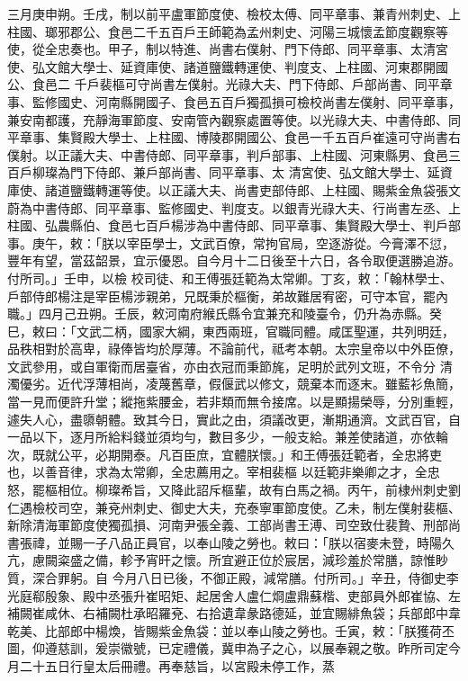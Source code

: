 \begin{pinyinscope}
 三月庚申朔。壬戌，制以前平盧軍節度使、檢校太傅、同平章事、兼青州刺史、上柱國、瑯邪郡公、食邑二千五百戶王師範為孟州刺史、河陽三城懷孟節度觀察等使，從全忠奏也。甲子，制以特進、尚書右僕射、門下侍郎、同平章事、太清宮使、弘文館大學士、延資庫使、諸道鹽鐵轉運使、判度支、上柱國、河東郡開國公、食邑二
 千戶裴樞可守尚書左僕射。光祿大夫、門下侍郎、戶部尚書、同平章事、監修國史、河南縣開國子、食邑五百戶獨孤損可檢校尚書左僕射、同平章事，兼安南都護，充靜海軍節度、安南管內觀察處置等使。以光祿大夫、中書侍郎、同平章事、集賢殿大學士、上柱國、博陵郡開國公、食邑一千五百戶崔遠可守尚書右僕射。以正議大夫、中書侍郎、同平章事，判戶部事、上柱國、河東縣男、食邑三百戶柳璨為門下侍郎、兼戶部尚書、同平章事、太
 清宮使、弘文館大學士、延資庫使、諸道鹽鐵轉運等使。以正議大夫、尚書吏部侍郎、上柱國、賜紫金魚袋張文蔚為中書侍郎、同平章事、監修國史、判度支。以銀青光祿大夫、行尚書左丞、上柱國、弘農縣伯、食邑七百戶楊涉為中書侍郎、同平章事、集賢殿大學士、判戶部事。庚午，敕：「朕以宰臣學士，文武百僚，常拘官局，空逐游從。今膏澤不愆，豐年有望，當茲韶景，宜示優恩。自今月十二日後至十六日，各令取便選勝追游。付所司。」壬申，以檢
 校司徒、和王傅張廷範為太常卿。丁亥，敕：「翰林學士、戶部侍郎楊注是宰臣楊涉親弟，兄既秉於樞衡，弟故難居宥密，可守本官，罷內職。」四月己丑朔。壬辰，敕河南府緱氏縣令宜兼充和陵臺令，仍升為赤縣。癸巳，敕曰：「文武二柄，國家大綱，東西兩班，官職同體。咸匡聖運，共列明廷，品秩相對於高卑，祿俸皆均於厚薄。不論前代，祗考本朝。太宗皇帝以中外臣僚，文武參用，或自軍衛而居臺省，亦由衣冠而秉節旄，足明於武列文班，不令分
 清濁優劣。近代浮薄相尚，凌蔑舊章，假偃武以修文，競棄本而逐末。雖藍衫魚簡，當一見而便許升堂；縱拖紫腰金，若非類而無令接席。以是顯揚榮辱，分別重輕，遽失人心，盡隳朝體。致其今日，實此之由，須議改更，漸期通濟。文武百官，自一品以下，逐月所給料錢並須均勻，數目多少，一般支給。兼差使諸道，亦依輪次，既就公平，必期開泰。凡百臣庶，宜體朕懷。」和王傅張廷範者，全忠將吏也，以善音律，求為太常卿，全忠薦用之。宰相裴樞
 以廷範非樂卿之才，全忠怒，罷樞相位。柳璨希旨，又降此詔斥樞輩，故有白馬之禍。丙午，前棣州刺史劉仁遇檢校司空，兼兗州刺史、御史大夫，充泰寧軍節度使。乙未，制左僕射裴樞、新除清海軍節度使獨孤損、河南尹張全義、工部尚書王溥、司空致仕裴贄、刑部尚書張禕，並賜一子八品正員官，以奉山陵之勞也。敕曰：「朕以宿麥未登，時陽久亢，慮闕粢盛之備，軫予宵旰之懷。所宜避正位於宸居，減珍羞於常膳，諒惟眇質，深合罪躬。自
 今月八日已後，不御正殿，減常膳。付所司。」辛丑，侍御史李光庭郗殷象、殿中丞張升崔昭矩、起居舍人盧仁烱盧鼎蘇楷、吏部員外郎崔協、左補闕崔咸休、右補闕杜承昭羅兗、右拾遺韋彖路德延，並宜賜緋魚袋；兵部郎中韋乾美、比部郎中楊煥，皆賜紫金魚袋：並以奉山陵之勞也。壬寅，敕：「朕獲荷丕圖，仰遵慈訓，爰崇徽號，已定禮儀，冀申為子之心，以展奉親之敬。昨所司定今月二十五日行皇太后冊禮。再奉慈旨，以宮殿未停工作，蒸

\end{pinyinscope}

